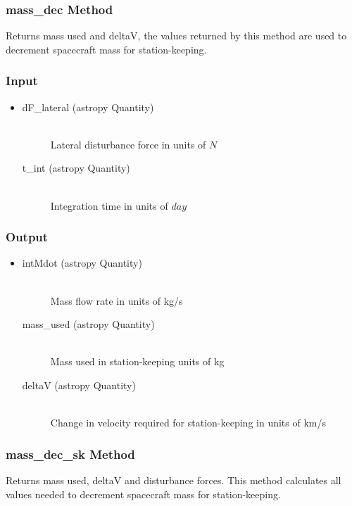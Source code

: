\documentclass[cleanfoot]{asme2ej}
\begin{document}
\subsubsection{mass\_dec Method} 
Returns mass used and deltaV, the values returned by this method are used to decrement spacecraft mass for station-keeping.
\subsubsection*{Input}
\begin{itemize}
\item
\begin{description}
    \item[dF\_lateral (astropy Quantity)] \hfill \\ Lateral disturbance force in units of $N$
    \item[t\_int (astropy Quantity)] \hfill \\ Integration time in units of $day$
\end{description}
\end{itemize}
\subsubsection*{Output}
\begin{itemize}
\item
\begin{description}
    \item[intMdot (astropy Quantity)] \hfill \\ Mass flow rate in units of kg/s
    \item[mass\_used (astropy Quantity)] \hfill \\ Mass used in station-keeping units of kg
    \item[deltaV (astropy Quantity)] \hfill \\ Change in velocity required for station-keeping in units of km/s
\end{description}
\end{itemize}

\subsubsection{mass\_dec\_sk Method} 
Returns mass used, deltaV and disturbance forces. This method calculates all values needed to decrement spacecraft mass for station-keeping.
\end{document}
